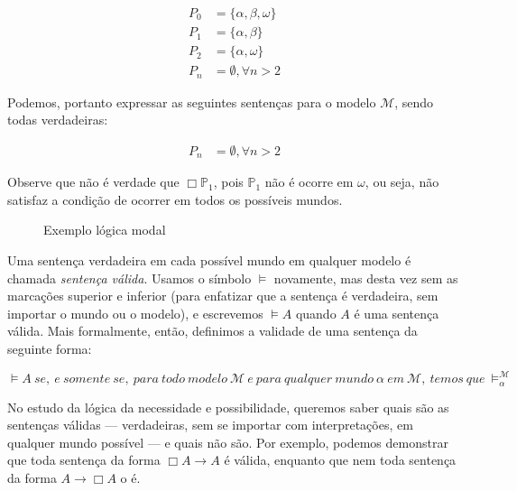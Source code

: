\begin{align}
    P_0 &= \{\alpha, \beta, \omega\} \\
    P_1 &= \{\alpha, \beta\}\\
    P_2 &= \{\alpha, \omega\}\\
    P_n &= \emptyset, \forall n > 2
\end{align}

Podemos, portanto expressar as seguintes sentenças para o modelo $\mathcal{M}$,
sendo todas verdadeiras:

\begin{align}
    P_n &= \emptyset, \forall n > 2
\end{align}

Observe que não é verdade que $\Box \mathbb{P}_1$, pois $\mathbb{P}_1$ não é
ocorre em $\omega$, ou seja, não satisfaz a condição de ocorrer em todos os
possíveis mundos.

\begin{figure}
\begin{center}
\label{figure:mundos_simples}
\caption{Exemplo lógica modal}
\end{center}
\end{figure}

Uma sentença verdadeira em cada possível mundo em qualquer modelo é chamada
\textit{sentença válida}. Usamos o símbolo $\models$ novamente, mas desta vez sem as
marcações superior e inferior (para enfatizar que a sentença é verdadeira, sem
importar o mundo ou o modelo), e escrevemos $\models A$ quando $A$ é uma
sentença válida.
Mais formalmente, então, definimos a validade de uma sentença da seguinte forma:

\begin{equation}
    \models A\ se,\ e\ somente\ se,\ para\ todo\ modelo\ \mathcal{M}\ e\ para\ 
    qualquer\ mundo\ \alpha\ em\ \mathcal{M},\ temos\ que\ \models ^{\mathcal{M}}_\alpha 
\end{equation}

No estudo da lógica da necessidade e possibilidade, queremos saber quais são as
sentenças válidas --- verdadeiras, sem se importar com interpretações, em
qualquer mundo possível --- e quais não são. Por exemplo, podemos demonstrar que
toda sentença da forma $\Box A \rightarrow A$ é válida, enquanto que nem toda
sentença da forma $A \rightarrow \Box A$ o é.


